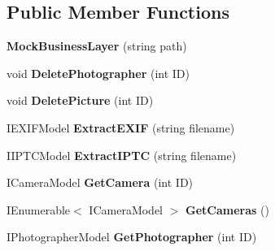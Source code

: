 \subsection*{Public Member Functions}
\begin{DoxyCompactItemize}
\item 
\mbox{\label{class_pic_d_b_1_1_mocks_1_1_mock_business_layer_a80f17c8df1c9bdc761ab58a2aec8c641}} 
{\bfseries Mock\+Business\+Layer} (string path)
\item 
\mbox{\label{class_pic_d_b_1_1_mocks_1_1_mock_business_layer_afb4190c5b143c272e58da9b8aed944fd}} 
void {\bfseries Delete\+Photographer} (int ID)
\item 
\mbox{\label{class_pic_d_b_1_1_mocks_1_1_mock_business_layer_a5132fb3d244b56bac77a588807db505b}} 
void {\bfseries Delete\+Picture} (int ID)
\item 
\mbox{\label{class_pic_d_b_1_1_mocks_1_1_mock_business_layer_a5a9a8aa15656dc27ab65475a813d1d39}} 
I\+E\+X\+I\+F\+Model {\bfseries Extract\+E\+X\+IF} (string filename)
\item 
\mbox{\label{class_pic_d_b_1_1_mocks_1_1_mock_business_layer_ae1d2b1f9e9407d2f98ad27f36b5ddedf}} 
I\+I\+P\+T\+C\+Model {\bfseries Extract\+I\+P\+TC} (string filename)
\item 
\mbox{\label{class_pic_d_b_1_1_mocks_1_1_mock_business_layer_aa0a2c6d0f0ed15709ec4d8a25342ef8e}} 
I\+Camera\+Model {\bfseries Get\+Camera} (int ID)
\item 
\mbox{\label{class_pic_d_b_1_1_mocks_1_1_mock_business_layer_acbdfbe27cbc52fe8d5356f4a48ea4225}} 
I\+Enumerable$<$ I\+Camera\+Model $>$ {\bfseries Get\+Cameras} ()
\item 
\mbox{\label{class_pic_d_b_1_1_mocks_1_1_mock_business_layer_a9dc10d5df91337dd2f8e05ac65b70017}} 
I\+Photographer\+Model {\bfseries Get\+Photographer} (int ID)

\end{DoxyCompactItemize}
